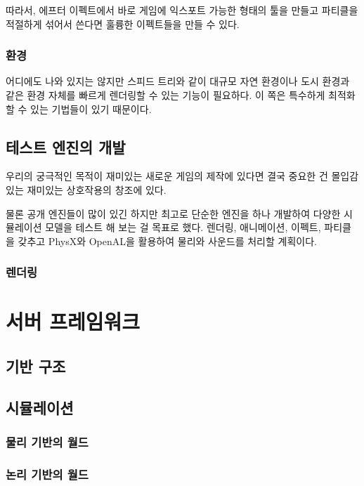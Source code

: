 \documentclass[chapter,kosection, 10.5pt, romanfixed, a4paper]{oblivoir}
\begin{document}
따라서, 에프터 이펙트에서 바로 게임에 익스포트 가능한 형태의 툴을 만들고 
파티클을 적절하게 섞어서 쓴다면 훌륭한 이펙트들을 만들 수 있다. 

\subsection{환경}

어디에도 나와 있지는 않지만 스피드 트리와 같이 대규모 자연 환경이나 
도시 환경과 같은 환경 자체를 빠르게 렌더링할 수 있는 기능이 필요하다. 
이 쪽은 특수하게 최적화 할 수 있는 기법들이 있기 때문이다. 


\section{테스트 엔진의 개발}

우리의 궁극적인 목적이 재미있는 새로운 게임의 제작에 있다면 결국 중요한 건 
몰입감 있는 재미있는 상호작용의 창조에 있다. 

물론 공개 엔진들이 많이 있긴 하지만 최고로 단순한 엔진을 하나 개발하여 다양한
시뮬레이션 모델을 테스트 해 보는 걸 목표로 했다. 렌더링, 애니메이션, 이펙트, 
파티클을 갖추고 PhysX와 OpenAL을 활용하여 물리와 사운드를 처리할 계획이다. 

\subsection{렌더링}

 
\chapter{서버 프레임워크}

\section{기반 구조}


\section{시뮬레이션}


\subsection{물리 기반의 월드}



\subsection{논리 기반의 월드}
\end{document}
